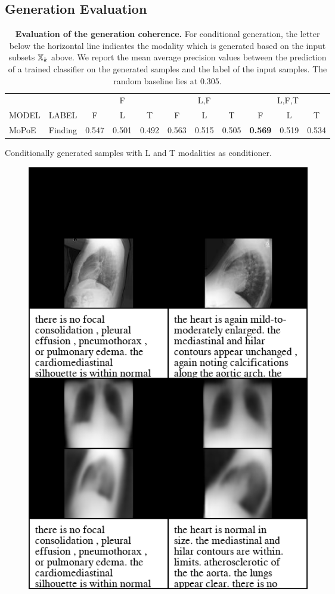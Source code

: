     \subsection{Generation Evaluation}

    \begin{frame}
    \begin{table}[]
        \centering
\begin{tabular}{lcccccccccc}

      &         & \multicolumn{3}{c}{F} & \multicolumn{3}{c}{L,F} & \multicolumn{3}{c}{L,F,T} \\  \cmidrule(l){3-5} \cmidrule(l){6-8} \cmidrule(l){9-11} MODEL &    LABEL     &         F &         L &         T &         F &         L &         T &         F &         L &         T \\\midrule
MoPoE & Finding &  0.547 &  0.501 &  0.492 &  0.563 &  0.515 &  0.505 &  \textbf{0.569} &  0.519 &  0.534
\end{tabular}
        \caption{\small{\textbf{Evaluation of the generation coherence.} For conditional generation, the letter below the horizontal line indicates the modality which is generated based on the input subsets $\mathbb{X} _k$ above. We report the mean average precision values between the prediction of a trained classifier on the generated samples and the label of the input samples. The random baseline lies at 0.305.}}
    \end{table}

    \end{frame}


    \begin{frame}{Conditionally generated samples with L and T modalities as conditioner.}

    \begin{figure}
    \centering
    \includegraphics[width=0.6\textwidth, height = 0.85\textheight, keepaspectratio]{slides/cond_gen/Lateral_text_blacked.png}

\end{figure}
    \end{frame}


